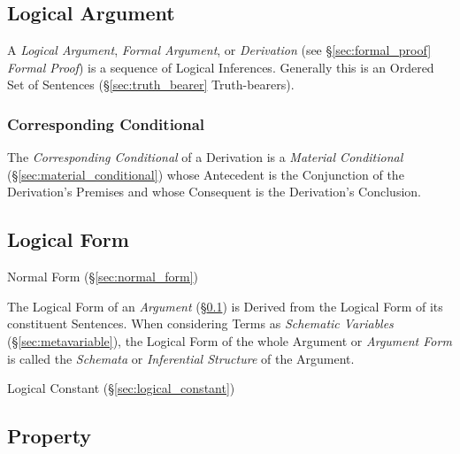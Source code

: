 \subsection{Logical Argument}\label{sec:logical_argument}

A \emph{Logical Argument}, \emph{Formal Argument}, or
\emph{Derivation} (see \S\ref{sec:formal_proof} \emph{Formal Proof})
is a sequence of Logical Inferences. Generally this is an Ordered Set
of Sentences (\S\ref{sec:truth_bearer} Truth-bearers).



\subsubsection{Corresponding Conditional}\label{sec:corresponding_conditional}

The \emph{Corresponding Conditional} of a Derivation is a
\emph{Material Conditional} (\S\ref{sec:material_conditional}) whose
Antecedent is the Conjunction of the Derivation's Premises and whose
Consequent is the Derivation's Conclusion.



\subsection{Logical Form}\label{sec:logical_form}

Normal Form (\S\ref{sec:normal_form})

The Logical Form of an \emph{Argument} (\S\ref{sec:logical_argument})
is Derived from the Logical Form of its constituent Sentences. When
considering Terms as \emph{Schematic Variables}
(\S\ref{sec:metavariable}), the Logical Form of the whole Argument or
\emph{Argument Form} is called the \emph{Schemata} or
\emph{Inferential Structure} of the Argument.



Logical Constant (\S\ref{sec:logical_constant})



\subsection{Property}\label{sec:property}


